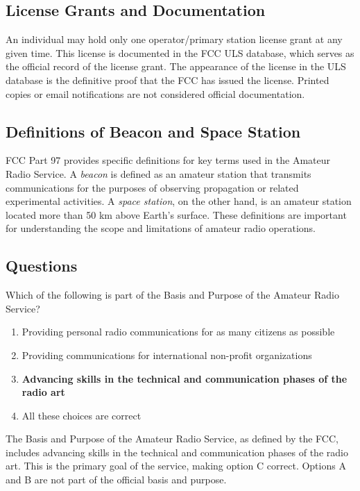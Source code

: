 \subsection*{License Grants and Documentation}
An individual may hold only one operator/primary station license grant at any given time. This license is documented in the FCC ULS database, which serves as the official record of the license grant. The appearance of the license in the ULS database is the definitive proof that the FCC has issued the license. Printed copies or email notifications are not considered official documentation.

\subsection*{Definitions of Beacon and Space Station}
FCC Part 97 provides specific definitions for key terms used in the Amateur Radio Service. A \textit{beacon} is defined as an amateur station that transmits communications for the purposes of observing propagation or related experimental activities. A \textit{space station}, on the other hand, is an amateur station located more than 50 km above Earth's surface. These definitions are important for understanding the scope and limitations of amateur radio operations.

\subsection*{Questions}

\begin{tcolorbox}[colback=gray!10!white,colframe=black!75!black,title={T1A01}]
    Which of the following is part of the Basis and Purpose of the Amateur Radio Service?
    \begin{enumerate}[label=\Alph*),noitemsep]
        \item Providing personal radio communications for as many citizens as possible
        \item Providing communications for international non-profit organizations
        \item \textbf{Advancing skills in the technical and communication phases of the radio art}
        \item All these choices are correct
    \end{enumerate}
\end{tcolorbox}
The Basis and Purpose of the Amateur Radio Service, as defined by the FCC, includes advancing skills in the technical and communication phases of the radio art. This is the primary goal of the service, making option C correct. Options A and B are not part of the official basis and purpose.


